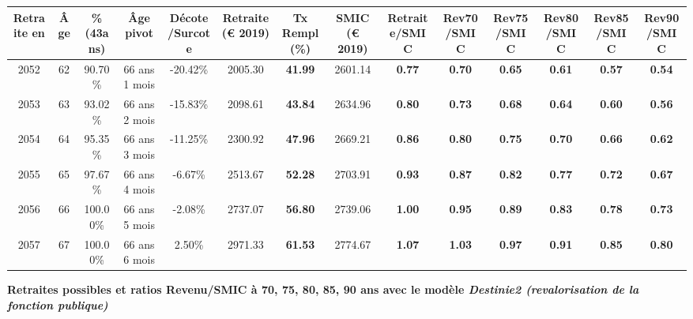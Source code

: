 \begin{adjustbox}{max width=\textwidth} 
\begin{tabular}[htb]{|c|c||c|c|c||c|c||c||c|c|c|c|c|c|} 
\hline 
 Retraite en &  Âge &  \%(43ans) &  Âge pivot &  Décote/Surcote &  Retraite (\euro{} 2019) &  Tx Rempl(\%) &  SMIC (\euro{} 2019) &  Retraite/SMIC &  Rev70/SMIC &  Rev75/SMIC &  Rev80/SMIC &  Rev85/SMIC &  Rev90/SMIC \\ 
\hline \hline 
 2052 &  62 &  90.70\% &  66 ans 1 mois &  -20.42\% &  2005.30 &  {\bf 41.99} &  2601.14 &  {\bf {\color{red} 0.77}} &  {\bf {\color{red} 0.70}} &  {\bf {\color{red} 0.65}} &  {\bf {\color{red} 0.61}} &  {\bf {\color{red} 0.57}} &  {\bf {\color{red} 0.54}} \\ 
\hline 
 2053 &  63 &  93.02\% &  66 ans 2 mois &  -15.83\% &  2098.61 &  {\bf 43.84} &  2634.96 &  {\bf {\color{red} 0.80}} &  {\bf {\color{red} 0.73}} &  {\bf {\color{red} 0.68}} &  {\bf {\color{red} 0.64}} &  {\bf {\color{red} 0.60}} &  {\bf {\color{red} 0.56}} \\ 
\hline 
 2054 &  64 &  95.35\% &  66 ans 3 mois &  -11.25\% &  2300.92 &  {\bf 47.96} &  2669.21 &  {\bf {\color{red} 0.86}} &  {\bf {\color{red} 0.80}} &  {\bf {\color{red} 0.75}} &  {\bf {\color{red} 0.70}} &  {\bf {\color{red} 0.66}} &  {\bf {\color{red} 0.62}} \\ 
\hline 
 2055 &  65 &  97.67\% &  66 ans 4 mois &  -6.67\% &  2513.67 &  {\bf 52.28} &  2703.91 &  {\bf {\color{red} 0.93}} &  {\bf {\color{red} 0.87}} &  {\bf {\color{red} 0.82}} &  {\bf {\color{red} 0.77}} &  {\bf {\color{red} 0.72}} &  {\bf {\color{red} 0.67}} \\ 
\hline 
 2056 &  66 &  100.00\% &  66 ans 5 mois &  -2.08\% &  2737.07 &  {\bf 56.80} &  2739.06 &  {\bf {\color{red} 1.00}} &  {\bf {\color{red} 0.95}} &  {\bf {\color{red} 0.89}} &  {\bf {\color{red} 0.83}} &  {\bf {\color{red} 0.78}} &  {\bf {\color{red} 0.73}} \\ 
\hline 
 2057 &  67 &  100.00\% &  66 ans 6 mois &  2.50\% &  2971.33 &  {\bf 61.53} &  2774.67 &  {\bf 1.07} &  {\bf 1.03} &  {\bf {\color{red} 0.97}} &  {\bf {\color{red} 0.91}} &  {\bf {\color{red} 0.85}} &  {\bf {\color{red} 0.80}} \\ 
\hline 
\hline 
\end{tabular} 
\end{adjustbox} 
 
 \vspace{0.1cm} 
{\bf \noindent Retraites possibles et ratios Revenu/SMIC à 70, 75, 80, 85, 90 ans avec le modèle \emph{Destinie2 (revalorisation de la fonction publique)}}  
 
